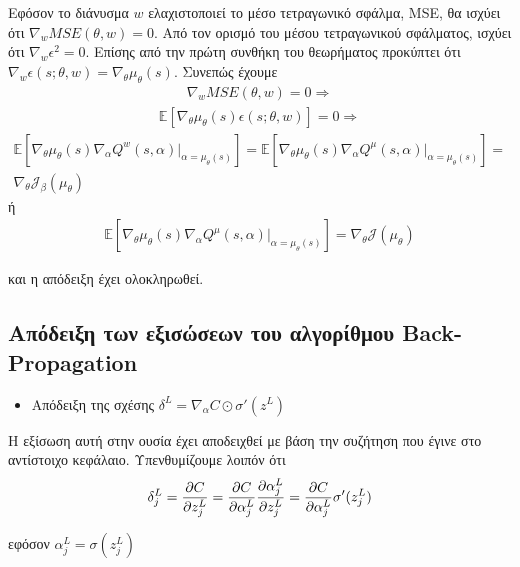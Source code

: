 \documentclass[11pt]{article} %
\numberwithin{equation}{subsection}
\begin{document}
Εφόσον το διάνυσμα $w$ ελαχιστοποιεί το μέσο τετραγωνικό σφάλμα, MSE, θα ισχύει ότι $\nabla_{w} MSE(\theta,w) = 0$. Από τον ορισμό του μέσου τετραγωνικού σφάλματος, ισχύει ότι $\nabla_{w} \epsilon^{2} = 0$. Επίσης από την πρώτη συνθήκη του θεωρήματος προκύπτει ότι $\nabla_{w} \epsilon(s; \theta, w) = \nabla_{\theta} \mu_{\theta}(s)$. Συνεπώς έχουμε\\
\begin{align*}
\nabla_{w} MSE(\theta, w) = 0 \Rightarrow 
\end{align*}
\begin{align*}
\mathbb{E} [\nabla_{\theta} \mu_{\theta}(s) \epsilon(s;\theta,w)] = 0 \Rightarrow 
\end{align*}
\begin{align*}
\mathbb{E} \left[\nabla_{\theta} \mu_{\theta}(s) \nabla_{\alpha} Q^{w}(s, \alpha)|_{\alpha = \mu_{\theta}(s)}\right] = \mathbb{E} \left[\nabla_{\theta} \mu_{\theta}(s) \nabla_{\alpha} Q^{\mu}(s, \alpha)|_{\alpha = \mu_{\theta}(s)}\right] = \\
\nabla_{\theta} \mathcal{J}_{\beta}(\mu_{\theta}) 
\end{align*}
ή\\
\begin{align*}
\mathbb{E} \left[\nabla_{\theta} \mu_{\theta}(s) \nabla_{\alpha} Q^{\mu}(s, \alpha)|_{\alpha = \mu_{\theta}(s)}\right] =\nabla_{\theta} \mathcal{J}(\mu_{\theta})
\end{align*}

και η απόδειξη έχει ολοκληρωθεί.\\


\subsection{Απόδειξη των εξισώσεων του αλγορίθμου Back-Propagation}
\begin{itemize}
\item Απόδειξη της σχέσης $\delta^{L} = \nabla_{\alpha} C \odot \sigma' (z^{L})$
\end{itemize}
Η εξίσωση αυτή στην ουσία έχει αποδειχθεί με βάση την συζήτηση που έγινε στο αντίστοιχο κεφάλαιο. Υπενθυμίζουμε λοιπόν ότι 
\begin{align*}
\delta_{j}^{L} = \pdv{C}{z_{j}^{L}} = \pdv{C}{\alpha_{j}^{L}} \pdv{\alpha_{j}^{L}}{z_{j}^{L}} = \pdv{C}{\alpha_{j}^{L}} \sigma' (z_{j}^{L})
\end{align*}

εφόσον $\alpha_{j}^{L} = \sigma (z_{j}^{L})$
\end{document}
